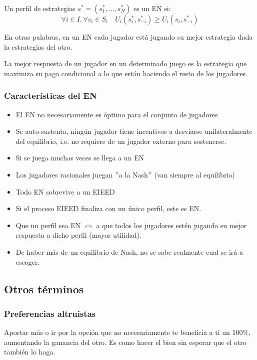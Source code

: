 Un perfil de estrategias $s^* = (s^*_1, ..., s^*_N)$ es un EN si:
\[\forall i \in I, \forall s_i \in S_i \quad U_i(s^*_i, s^*_{-i}) \geq U_i(s_i, s^*_{-i})\]

En otras palabras, en un EN cada jugador está jugando su mejor estrategia dada la estrategias del otro. 

La mejor respuesta de un jugador en un determinado juego es la estrategia que maximiza su pago condicional a lo que están haciendo el resto de los jugadores.


\subsubsection{Características del EN}

\begin{itemize}
    \item El EN no necesariamente es óptimo para el conjunto de jugadores
    \item Se auto-sustenta, ningún jugador tiene incentivos a desviarse unilateralmente del equilibrio, i.e. no requiere de un jugador externo para sostenerse. 
    \item Si se juega muchas veces se llega a un EN
    \item Los jugadores racionales juegan $"$a la Nash$"$ (van siempre al equilibrio)
    \item Todo EN sobrevive a un EIEED
    \item Si el proceso EIEED finaliza con un único perfil, este es EN.
    \item Que un perfil sea EN $\iff$ a que todos los jugadores estén jugando su mejor respuesta a dicho perfil (mayor utilidad).
    \item De haber más de un equilibrio de Nash, no se sabe realmente cual se irá a escoger.
\end{itemize}

\subsection{Otros términos}

\subsubsection{Preferencias altruistas} Aportar más o ir por la opción que no necesariamente te beneficia a ti un 100\%, aumentando la ganancia del otro. Es como hacer el bien sin esperar que el otro también lo haga.


